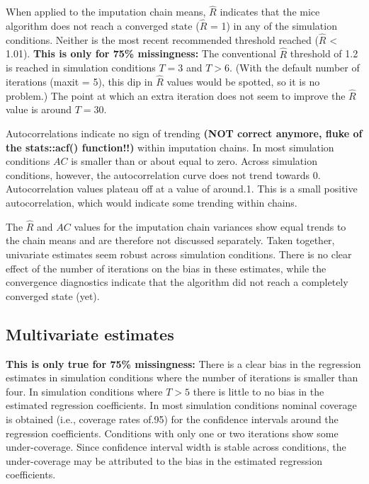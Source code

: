\documentclass[Royal,times,sageh]{sagej}
\begin{document}
When applied to the imputation chain means, \(\widehat{R}\) indicates
that the mice algorithm does not reach a converged state
(\(\widehat{R}\) = 1) in any of the simulation conditions. Neither is
the most recent recommended threshold reached (\(\widehat{R}\)
\textless{} 1.01). \textbf{This is only for 75\% missingness:} The
conventional \(\widehat{R}\) threshold of 1.2 is reached in simulation
conditions \(T = 3\) and \(T > 6\). (With the default number of
iterations (maxit = 5), this dip in \(\widehat{R}\) values would be
spotted, so it is no problem.) The point at which an extra iteration
does not seem to improve the \(\widehat{R}\) value is around \(T=30\).

Autocorrelations indicate no sign of trending \textbf{(NOT correct
anymore, fluke of the stats::acf() function!!)} within imputation
chains. In most simulation conditions \(AC\) is smaller than or about
equal to zero. Across simulation conditions, however, the
autocorrelation curve does not trend towards 0. Autocorrelation values
plateau off at a value of around.1. This is a small positive
autocorrelation, which would indicate some trending within chains.

The \(\widehat{R}\) and \(AC\) values for the imputation chain variances
show equal trends to the chain means and are therefore not discussed
separately. Taken together, univariate estimates seem robust across
simulation conditions. There is no clear effect of the number of
iterations on the bias in these estimates, while the convergence
diagnostics indicate that the algorithm did not reach a completely
converged state (yet).

\hypertarget{multivariate-estimates}{%
\subsection{Multivariate estimates}\label{multivariate-estimates}}

\textbf{This is only true for 75\% missingness:} There is a clear bias
in the regression estimates in simulation conditions where the number of
iterations is smaller than four. In simulation conditions where
\(T > 5\) there is little to no bias in the estimated regression
coefficients. In most simulation conditions nominal coverage is obtained
(i.e., coverage rates of.95) for the confidence intervals around the
regression coefficients. Conditions with only one or two iterations show
some under-coverage. Since confidence interval width is stable across
conditions, the under-coverage may be attributed to the bias in the
estimated regression coefficients.
\end{document}
